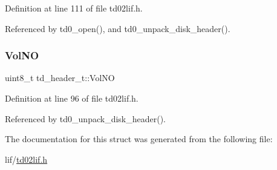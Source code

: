 Definition at line 111 of file td02lif.\+h.



Referenced by td0\+\_\+open(), and td0\+\_\+unpack\+\_\+disk\+\_\+header().

\mbox{\label{structtd__header__t_a081c4518281071d65fe82f6c8260b1f5}} 
\subsubsection{\texorpdfstring{Vol\+NO}{VolNO}}
{\footnotesize\ttfamily uint8\+\_\+t td\+\_\+header\+\_\+t\+::\+Vol\+NO}



Definition at line 96 of file td02lif.\+h.



Referenced by td0\+\_\+unpack\+\_\+disk\+\_\+header().



The documentation for this struct was generated from the following file\+:\begin{DoxyCompactItemize}
\item 
lif/\hyperlink{td02lif_8h}{td02lif.\+h}\end{DoxyCompactItemize}
